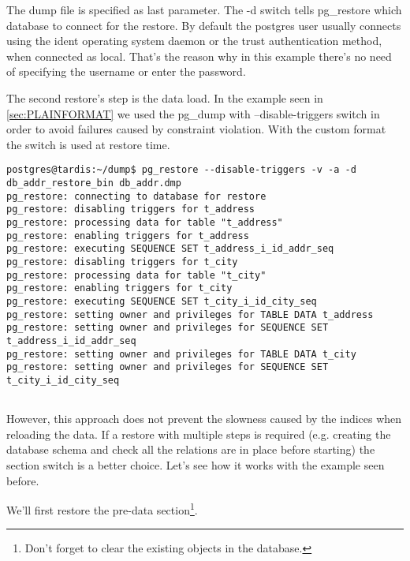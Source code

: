 The dump file is specified as last parameter. The -d switch tells pg\_restore which database to 
connect for the restore. By default the postgres user usually connects using the ident 
operating system daemon or the trust authentication method, when connected as local. That's the 
reason why in this example there's no need of specifying the username or enter the 
password.\newline 

The second restore's step is the data load. In the example seen in \ref{sec:PLAINFORMAT} we used 
the pg\_dump with --disable-triggers switch in order to avoid failures caused by constraint 
violation. With the custom format the switch is used at restore time.

\begin{verbatim}
postgres@tardis:~/dump$ pg_restore --disable-triggers -v -a -d db_addr_restore_bin db_addr.dmp 
pg_restore: connecting to database for restore
pg_restore: disabling triggers for t_address
pg_restore: processing data for table "t_address"
pg_restore: enabling triggers for t_address
pg_restore: executing SEQUENCE SET t_address_i_id_addr_seq
pg_restore: disabling triggers for t_city
pg_restore: processing data for table "t_city"
pg_restore: enabling triggers for t_city
pg_restore: executing SEQUENCE SET t_city_i_id_city_seq
pg_restore: setting owner and privileges for TABLE DATA t_address
pg_restore: setting owner and privileges for SEQUENCE SET t_address_i_id_addr_seq
pg_restore: setting owner and privileges for TABLE DATA t_city
pg_restore: setting owner and privileges for SEQUENCE SET t_city_i_id_city_seq
 
\end{verbatim}

However, this approach does not prevent the slowness caused by the indices when reloading the data.
If a restore with multiple steps is required (e.g. creating the database schema and check all the 
relations are in place before starting) the section switch is a better choice. Let's see how it 
works with the example seen before.\newline

We'll first restore the pre-data section\footnote{Don't forget to clear the existing objects in 
the database.}.

